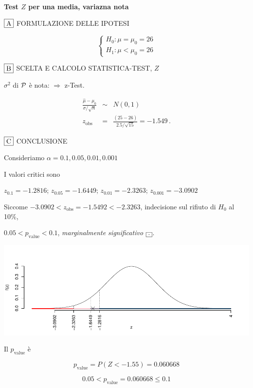 \documentclass[
  11pt,
]{book}
\theoremstyle{mytheoremstyle}
\theoremstyle{mydefstyle}
\newenvironment{sol}
  {
  \begin{tcolorbox}[enhanced,breakable,arc=0.1mm,boxrule=1pt,colback=white,colframe=iblue,
  title=\bf \fontfamily{lmss}\selectfont \hspace{.5 cm} Soluzione,drop fuzzy shadow]

}{
\end{tcolorbox}
  }
\begin{document}
\begin{sol}
\textbf{Test \(Z\) per una media, variazna nota}

\(\fbox{A}\) FORMULAZIONE DELLE IPOTESI

\[\begin{cases}
   H_0: \mu = \mu_0=26 \\
   H_1: \mu < \mu_0=26 
   \end{cases}\]

\(\fbox{B}\) SCELTA E CALCOLO STATISTICA-TEST, \(Z\)

\(\sigma^{2}\) di \(\cal{P}\) è nota: \(\Rightarrow\) z-Test.

\begin{eqnarray*}
   \frac{\hat\mu - \mu_{0}} {\sigma/\sqrt{n}}&\sim&N(0,1)\\
   z_{\text{obs}}
   &=& \frac{ ( 25 -  26 )} { 2.5 /\sqrt{ 15 }}
   =   -1.549 \, .
   \end{eqnarray*}

\(\fbox{C}\) CONCLUSIONE

Consideriamo \(\alpha=0.1, 0.05, 0.01, 0.001\)

I valori critici sono

\(z_{0.1}=-1.2816\); \(z_{0.05}=-1.6449\); \(z_{0.01}=-2.3263\); \(z_{0.001}=-3.0902\)

Siccome \(-3.0902<z_\text{obs}=-1.5492<-2.3263\), indecisione sul rifiuto di \(H_0\) al 10\%,

\(0.05<p_\text{value}<0.1\), \emph{marginalmente significativo} \(\fbox{.}\).

\begin{center}\includegraphics{Esami_passati_con_soluzioni_files/figure-latex/05-test-4,-1} \end{center}

Il \(p_{\text{value}}\) è

\[ p_{\text{value}} = P(Z<-1.55)=0.060668 \]

\[
 0.05 < p_\text{value}= 0.060668 \leq 0.1 
\]

\end{sol}
\end{document}
